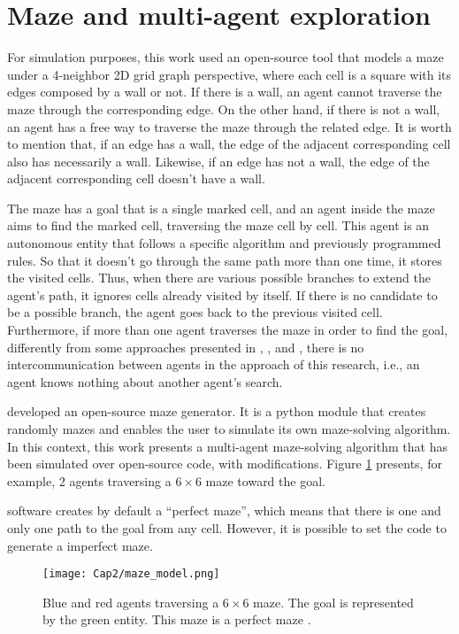 \section{Maze and multi-agent exploration}
\label{section_models_maze}
For simulation purposes, this work used an open-source tool that models a maze under a 4-neighbor 2D grid graph perspective, where each cell is a square with its edges composed by a wall or not. If there is a wall, an agent cannot traverse the maze through the corresponding edge. On the other hand, if there is not a wall, an agent has a free way to traverse the maze through the related edge. It is worth to mention that, if an edge has a wall, the edge of the adjacent corresponding cell also has necessarily a wall. Likewise, if an edge has not a wall, the edge of the adjacent corresponding cell doesn't have a wall.

The maze has a goal that is a single marked cell, and an agent inside the maze aims to find the marked cell, traversing the maze cell by cell. This agent is an autonomous entity that follows a specific algorithm and previously programmed rules. So that it doesn't go through the same path more than one time, it stores the visited cells. Thus, when there are various possible branches to extend the agent's path, it ignores cells already visited by itself. If there is no candidate to be a possible branch, the agent goes back to the previous visited cell. Furthermore, if more than one agent traverses the maze in order to find the goal, differently from some approaches presented in , , and , there is no intercommunication between agents in the approach of this research, i.e., an agent knows nothing about another agent's search.

 developed an open-source maze generator. It is a python module that creates randomly mazes and enables the user to simulate its own maze-solving algorithm. In this context, this work presents a multi-agent maze-solving algorithm that has been simulated over  open-source code, with modifications. Figure \ref{maze_model} presents, for example, 2 agents traversing a $6 \times 6$ maze toward the goal.

 software creates by default a ``perfect maze'', which means that there is one and only one path to the goal from any cell. However, it is possible to set the code to generate a imperfect maze.

\begin{figure}[ht!]
\centering
\texttt{[image: Cap2/maze\_model.png]}
\caption{Blue and red agents traversing a $6\times 6$ maze. The goal is represented by the green entity. This maze is a perfect maze \cite{Muhammad2021}.}
\label{maze_model}
\end{figure}

